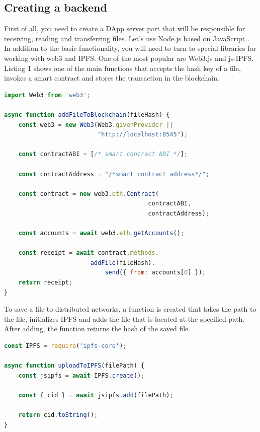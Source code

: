 \documentclass[10pt,conference,a4paper]{IEEEtran_EDM}
\begin{document}
\subsection{Creating a backend}
First of all, you need to create a DApp server part that will be responsible for receiving, reading and transferring files. Let's use Node.js based on JavaScript \cite{Herron} . In addition to the basic functionality, you will need to turn to special libraries for working with web3 and IPFS. One of the most popular are Web3.js and js-IPFS. Listing 1 shows one of the main functions that accepts the hash key of a file, invokes a smart contract and stores the transaction in the blockchain.


\begin{lstlisting}[language=JavaScript, caption=JavaScript code implementing saving to the blockchain]
import Web3 from 'web3';

async function addFileToBlockchain(fileHash) {
    const web3 = new Web3(Web3.givenProvider ||
                          "http://localhost:8545");

    const contractABI = [/* smart contract ABI */];

    const contractAddress = "/*smart contract address*/";

    const contract = new web3.eth.Contract(
                                        contractABI,
                                        contractAddress);

    const accounts = await web3.eth.getAccounts();

    const receipt = await contract.methods.
                        addFile(fileHash).
                            send({ from: accounts[0] });
    return receipt;
}
\end{lstlisting}

To save a file to distributed networks, a function is created that takes the path to the file, initializes IPFS and adds the file that is located at the specified path. After adding, the function returns the hash of the saved file.

\begin{lstlisting}[language=JavaScript, caption= Saving a file to IPFS]
const IPFS = require('ipfs-core');

async function uploadToIPFS(filePath) {
    const jsipfs = await IPFS.create();

    const { cid } = await jsipfs.add(filePath);

    return cid.toString();
}
\end{lstlisting}
\end{document}
